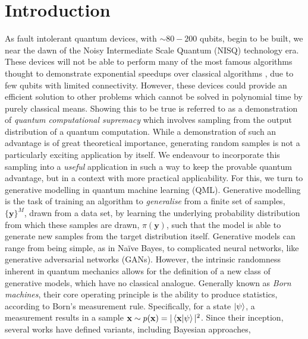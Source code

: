 \section*{Introduction} \label{sec:intro}

As fault intolerant quantum devices, with $\sim 80-200$ qubits, begin to be built, we near the dawn of the Noisy Intermediate Scale Quantum (NISQ) \cite{preskill_quantum_2018} technology era. These devices will not be able to perform many of the most famous algorithms thought to demonstrate exponential speedups over classical algorithms \cite{shor_polynomial-time_1997, harrow_quantum_2009}, due to few qubits with limited connectivity. However, these devices could provide an efficient solution to other problems which cannot be solved in polynomial time by purely classical means. 
Showing this to be true is referred to as a demonstration of 
\textit{quantum computational supremacy}\cite{bremner_classical_2011, gao_quantum_2017, bremner_average-case_2016,  aaronson_computational_2013, farhi_quantum_2016, boixo_characterizing_2018} 
which involves sampling from the output distribution of a quantum computation.
While a demonstration of such an advantage is of great theoretical importance, generating random samples is not a particularly exciting application by itself. We endeavour to incorporate this sampling into a \textit{useful} application in such a way to keep the provable quantum advantage, but in a context with more practical applicability. For this, we turn to generative modelling in quantum machine learning (QML). Generative modelling is the task of training an algorithm to \textit{generalise} from a finite set of samples, $\{\mathbf{y}\}^M$, drawn from a data set, by learning the underlying probability distribution from which these samples are drawn, $\pi(\mathbf{y})$, such that the model is able to generate new samples from the target distribution itself. Generative models can range from being simple, as in Na{\"i}ve Bayes\cite{maron_automatic_1961}, to complicated neural networks, like generative adversarial networks (GANs)\cite{goodfellow_generative_2014}. However, the intrinsic randomness inherent in quantum mechanics allows for the definition of a new class of generative models, which have no classical analogue. Generally known as \textit{Born machines}\cite{cheng_information_2017, liu_differentiable_2018}, their core operating principle is the ability to produce statistics, according to Born's measurement rule. Specifically, for a state $\ket{\psi}$, a measurement results in a sample $\mathbf{x} \sim p(\mathbf{x}) = |\braket{\mathbf{x}|\psi}|^2 \label{bornrule}$. Since their inception, several works have defined variants, including Bayesian approaches\cite{du_expressive_2018}, 
